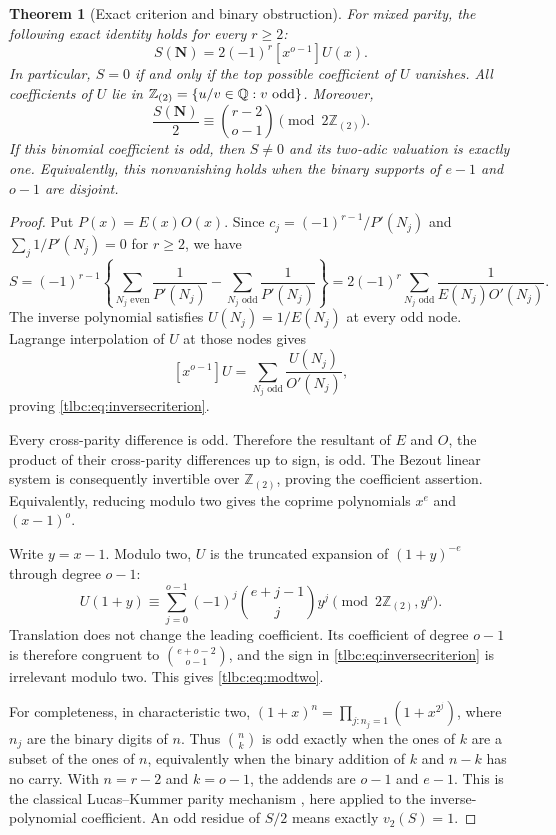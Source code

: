 \documentclass[11pt,letterpaper]{article}
\numberwithin{equation}{section}
\newtheorem{theorem}{Theorem}[section]
\theoremstyle{definition}\newtheorem{definition}[theorem]{Definition}
\theoremstyle{remark}\newtheorem{remark}[theorem]{Remark}
\newcommand{\tz}{\mathbb Z_{(2)}}
\begin{document}
\begin{theorem}[Exact criterion and binary obstruction]\label{tlbc:thm:binary}
For mixed parity, the following exact identity holds for every $r\ge2$:
\begin{equation}\label{tlbc:eq:inversecriterion}
 \boxed{\displaystyle
 S(\boldsymbol N)=2(-1)^r[x^{o-1}]U(x).}
\end{equation}
In particular, $S=0$ if and only if the top possible coefficient of $U$ vanishes. All coefficients of $U$ lie in
$\tz=\{u/v\in\Q:v\text{ odd}\}$. Moreover,
\begin{equation}\label{tlbc:eq:modtwo}
 \frac{S(\boldsymbol N)}2
 \equiv\binom{r-2}{o-1}\pmod{2\tz}.
\end{equation}
If this binomial coefficient is odd, then $S\ne0$ and its two-adic valuation is exactly one. Equivalently, this nonvanishing holds when the binary supports of $e-1$ and $o-1$ are disjoint.
\end{theorem}
\begin{proof}
Put $P(x)=E(x)O(x)$. Since
$c_j=(-1)^{r-1}/P'(N_j)$ and $\sum_j1/P'(N_j)=0$ for $r\ge2$, we have
\[
 S=(-1)^{r-1}\left\{\sum_{N_j\text{ even}}\frac1{P'(N_j)}
                         -\sum_{N_j\text{ odd}}\frac1{P'(N_j)}\right\}
   =2(-1)^r\sum_{N_j\text{ odd}}\frac1{E(N_j)O'(N_j)}.
\]
The inverse polynomial satisfies $U(N_j)=1/E(N_j)$ at every odd node. Lagrange interpolation of $U$ at those nodes gives
\[
 [x^{o-1}]U=\sum_{N_j\text{ odd}}\frac{U(N_j)}{O'(N_j)},
\]
proving \eqref{tlbc:eq:inversecriterion}.

Every cross-parity difference is odd. Therefore the resultant of $E$ and $O$, the product of their cross-parity differences up to sign, is odd. The Bezout linear system is consequently invertible over $\tz$, proving the coefficient assertion. Equivalently, reducing modulo two gives the coprime polynomials $x^e$ and $(x-1)^o$.

Write $y=x-1$. Modulo two, $U$ is the truncated expansion of $(1+y)^{-e}$ through degree $o-1$:
\[
 U(1+y)\equiv\sum_{j=0}^{o-1}(-1)^j\binom{e+j-1}{j}y^j
       \pmod{2\tz,y^o}.
\]
Translation does not change the leading coefficient. Its coefficient of degree $o-1$ is therefore congruent to $\binom{e+o-2}{o-1}$, and the sign in \eqref{tlbc:eq:inversecriterion} is irrelevant modulo two. This gives \eqref{tlbc:eq:modtwo}.

For completeness, in characteristic two,
$(1+x)^n=\prod_{j:n_j=1}(1+x^{2^j})$, where $n_j$ are the binary digits of $n$. Thus $\binom nk$ is odd exactly when the ones of $k$ are a subset of the ones of $n$, equivalently when the binary addition of $k$ and $n-k$ has no carry. With $n=r-2$ and $k=o-1$, the addends are $o-1$ and $e-1$. This is the classical Lucas--Kummer parity mechanism \cite{Granville}, here applied to the inverse-polynomial coefficient. An odd residue of $S/2$ means exactly $v_2(S)=1$.
\end{proof}
\end{document}
